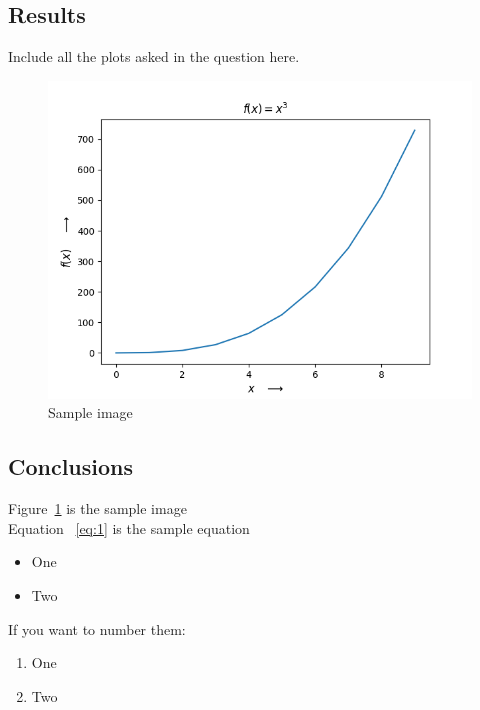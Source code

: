 \documentclass[12pt, a4paper]{report}
\begin{document}
\subsection*{Results}
Include all the plots asked in the question here.
 \begin{figure}[H]
	\centering
	\includegraphics[scale=0.8]{Figure_1.png}  %
	\caption{Sample image}
	\label{fig:sample}
\end{figure} 


\subsection*{Conclusions}
Figure~\ref{fig:sample} is the sample image  \\
Equation ~\ref{eq:1} is the sample equation 
   \begin{itemize}
  	\item One
  	\item Two
  \end{itemize}
  If you want to number them:
  \begin{enumerate}
      \item One 
      \item Two
  \end{enumerate}
\end{document}
